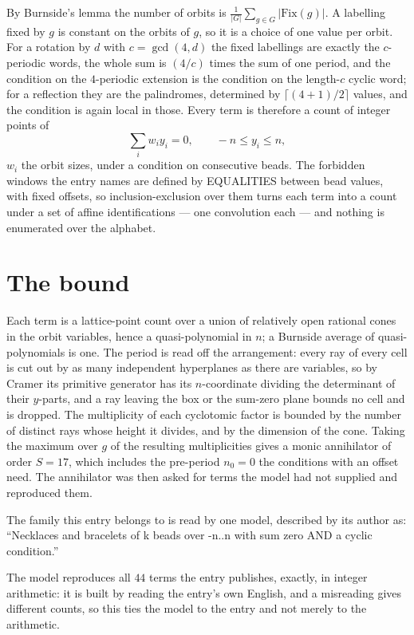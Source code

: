 \documentclass[11pt,a4paper]{article}
\theoremstyle{plain}
\theoremstyle{definition}
\begin{document}
By Burnside's lemma the number of orbits is $\frac{1}{|G|}\sum_{g\in G}|\mathrm{Fix}(g)|$.
A labelling fixed by $g$ is constant on the orbits of $g$, so it is a choice of one value per
orbit. For a rotation by $d$ with $c=\gcd(4,d)$ the fixed labellings are exactly the
$c$-periodic words, the whole sum is $(4/c)$ times the sum of one period, and the condition on
the $4$-periodic extension is the condition on the length-$c$ cyclic word; for a reflection
they are the palindromes, determined by $\lceil(4+1)/2\rceil$ values, and the condition is
again local in those. Every term is therefore a count of integer points of
\[
\sum_i w_i y_i = 0, \qquad -n \le y_i \le n,
\]
$w_i$ the orbit sizes, under a condition on consecutive beads. The forbidden windows the entry
names are defined by EQUALITIES between bead values, with fixed offsets, so inclusion-exclusion
over them turns each term into a count under a set of affine identifications --- one
convolution each --- and nothing is enumerated over the alphabet.

\section{The bound}

Each term is a lattice-point count over a union of relatively open rational cones in the orbit
variables, hence a quasi-polynomial in $n$; a Burnside average of quasi-polynomials is one. The
period is read off the arrangement: every ray of every cell is cut out by as many independent
hyperplanes as there are variables, so by Cramer its primitive generator has its $n$-coordinate
dividing the determinant of their $y$-parts, and a ray leaving the box or the sum-zero plane
bounds no cell and is dropped. The multiplicity of each cyclotomic factor is bounded by the
number of distinct rays whose height it divides, and by the dimension of the cone. Taking the
maximum over $g$ of the resulting multiplicities gives a monic annihilator of order
$S=17$, which includes the pre-period $n_0=0$ the conditions with an offset need. The
annihilator was then asked for terms the model had not supplied and reproduced them.

The family this entry belongs to is read by one model, described by its author as: ``Necklaces and bracelets of k beads over -n..n with sum zero AND a cyclic condition.''


The model reproduces all $44$ terms the entry publishes, exactly, in integer arithmetic:
it is built by reading the entry's own English, and a misreading gives different counts, so
this ties the model to the entry and not merely to the arithmetic.
\end{document}
